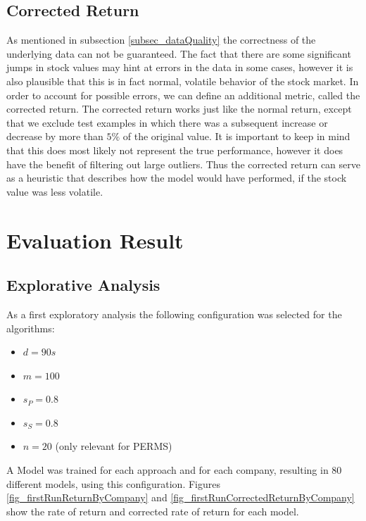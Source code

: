 \subsection{Corrected Return}
As mentioned in subsection \ref{subsec_dataQuality} the correctness of the underlying data can not be guaranteed. The fact that there are some significant jumps in stock values may hint at errors in the data in some cases, however it is also plausible that this is in fact normal, volatile behavior of the stock market. In order to account for possible errors, we can define an additional metric, called the corrected return. The corrected return works just like the normal return, except that we exclude test examples in which there was a subsequent increase or decrease by more than $5\%$ of the original value. It is important to keep in mind that this does most likely not represent the true performance, however it does have the benefit of filtering out large outliers. Thus the corrected return can serve as a heuristic that describes how the model would have performed, if the stock value was less volatile.

\section{Evaluation Result}
\label{sec_evaluationResults}

\subsection{Explorative Analysis}

As a first exploratory analysis the following configuration was selected for the algorithms:

\begin{itemize}
	\item $d = 90s$
	\item $m = 100$ 
	\item $s_P = 0.8$
	\item $s_S = 0.8$
	\item $n = 20$ (only relevant for PERMS)
\end{itemize}

A Model was trained for each approach and for each company, resulting in 80 different models, using this configuration. Figures  \ref{fig_firstRunReturnByCompany} and \ref{fig_firstRunCorrectedReturnByCompany} show the rate of return and corrected rate of return for each model.

